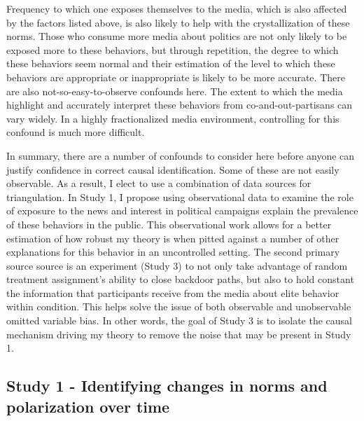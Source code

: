 \documentclass [12pt]{article}
\begin{document}
Frequency to which one exposes themselves to the media, which is also affected by the factors listed above, is also likely to help with the crystallization of these norms. Those who consume more media about politics are not only likely to be exposed more to these behaviors, but through repetition, the degree to which these behaviors seem normal and their estimation of the level to which these behaviors are appropriate or inappropriate is likely to be more accurate. There are also not-so-easy-to-observe confounds here. The extent to which the media highlight and accurately interpret these behaviors from co-and-out-partisans can vary widely. In a highly fractionalized media environment, controlling for this confound is much more difficult.

In summary, there are a number of confounds to consider here before anyone can justify confidence in correct causal identification. Some of these are not easily observable. As a result, I elect to use a combination of data sources for triangulation. In Study 1, I propose using observational data to examine the role of exposure to the news and interest in political campaigns explain the prevalence of these behaviors in the public. This observational work allows for a better estimation of how robust my theory is when pitted against a number of other explanations for this behavior in an uncontrolled setting. The second primary source source is an experiment (Study 3) to not only take advantage of random treatment assignment's ability to close backdoor paths, but also to hold constant the information that participants receive from the media about elite behavior within condition. This helps solve the issue of both observable and unobservable omitted variable bias. In other words, the goal of Study 3 is to isolate the causal mechanism driving my theory to remove the noise that may be present in Study 1. 

\subsection{Study 1 - Identifying changes in norms and polarization over time}
\end{document}
